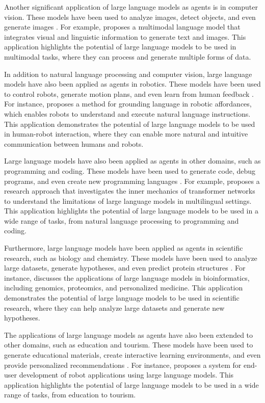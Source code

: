 \documentclass[11pt]{article}
\begin{document}
Another significant application of large language models as agents is in computer vision. These models have been used to analyze images, detect objects, and even generate images \cite{ref20}. For example, \cite{ref21} proposes a multimodal language model that integrates visual and linguistic information to generate text and images. This application highlights the potential of large language models to be used in multimodal tasks, where they can process and generate multiple forms of data.

In addition to natural language processing and computer vision, large language models have also been applied as agents in robotics. These models have been used to control robots, generate motion plans, and even learn from human feedback \cite{ref22}. For instance, \cite{ref23} proposes a method for grounding language in robotic affordances, which enables robots to understand and execute natural language instructions. This application demonstrates the potential of large language models to be used in human-robot interaction, where they can enable more natural and intuitive communication between humans and robots.

Large language models have also been applied as agents in other domains, such as programming and coding. These models have been used to generate code, debug programs, and even create new programming languages \cite{ref24}. For example, \cite{ref25} proposes a research approach that investigates the inner mechanics of transformer networks to understand the limitations of large language models in multilingual settings. This application highlights the potential of large language models to be used in a wide range of tasks, from natural language processing to programming and coding.

Furthermore, large language models have been applied as agents in scientific research, such as biology and chemistry. These models have been used to analyze large datasets, generate hypotheses, and even predict protein structures \cite{ref26}. For instance, \cite{ref27} discusses the applications of large language models in bioinformatics, including genomics, proteomics, and personalized medicine. This application demonstrates the potential of large language models to be used in scientific research, where they can help analyze large datasets and generate new hypotheses.

The applications of large language models as agents have also been extended to other domains, such as education and tourism. These models have been used to generate educational materials, create interactive learning environments, and even provide personalized recommendations \cite{ref28}. For instance, \cite{ref29} proposes a system for end-user development of robot applications using large language models. This application highlights the potential of large language models to be used in a wide range of tasks, from education to tourism.
\end{document}
